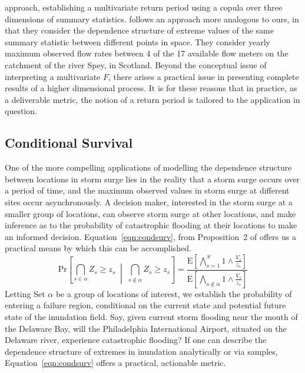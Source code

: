     approach, establishing a multivariate return period using a copula over three dimensions of summary statistics.
    \cite{salvadori2010} follows an approach more analogous to ours, in that they consider the dependence 
    structure of extreme values of the same summary statistic between different points in space.  They
    consider yearly maximum observed flow rates between 4 of the 17 available flow meters on the catchment 
    of the river Spey, in Scotland.  
    Beyond the conceptual issue of interpreting a multivariate $F$, there arises a practical issue in presenting
    complete results of a higher dimensional process.
    It is for these reasons that in practice, as a deliverable metric, the notion of a return period is
    tailored to the application in question.
       
\subsection{Conditional Survival}
One of the more compelling applications of modelling the dependence structure between locations in 
    storm surge lies in the reality that a storm surge occurs over a period of time, and the 
    maximum observed values in storm surge at different sites occur asynchronously.  A decision maker,
    interested in the storm surge at a smaller group of locations, can observe storm surge at other
    locations, and make inference as to the probability of catastrophic flooding at their locations
    to make an informed decision.
    Equation~\eqref{eqn:condsurv}, from Proposition~2 of \cite{trubey:pg} offers us a practical means
    by which this can be accomplished.
    \begin{equation}
        \label{eqn:condsurv}
        \text{Pr}\left[\bigcap_{s\in\alpha}Z_s \geq z_s\;\middle|\;\bigcap_{s\not\in\alpha}Z_s \geq z_s\right] =
        \frac{
            \text{E}\left[\bigwedge_{s=1}^S 1\wedge \frac{V_s}{z_s}\right]
        }{
            \text{E}\left[\bigwedge_{s\not\in\alpha} 1\wedge \frac{V_s}{z_s}\right]
        }
    \end{equation}
    Letting Set $\alpha$ be a group of locations of interest, we establish the probability of
    entering a failure region, conditional on the current state and potential future state of the 
    inundation field.  Say, given current storm flooding near the mouth of the Delaware Bay, will the 
    Philadelphia International Airport, situated on the Delaware river, experience catastrophic flooding?  
    If one can describe the dependence structure of extremes in inundation analytically or via samples,
    Equation~\ref{eqn:condsurv} offers a practical, actionable metric.
    
